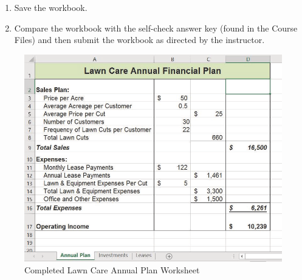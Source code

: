 \begin{enumerate}
	\begin{enumerate}
		\item On the  sheet, apply Accounting format with $ 0 $ decimals to ,  , and . Apply Comma format with $ 0 $ decimals to the ranges  and . 

		\item On the  worksheet, apply Accounting format with two decimals to the range  and . Apply Comma format with two decimals to the range . 
	\end{enumerate}
	
	Double check that the formatting matches Figures \ref{02:fig47}, \ref{02:fig48}, and \ref{02:fig49}.
	
	\item Save the  workbook.
	
	\item Compare the workbook with the self-check answer key (found in the Course Files) and then submit the  workbook as directed by the instructor.
\end{enumerate}

\begin{figure}[H]
	\centering
	\includegraphics[width=\maxwidth{.95\linewidth}]{gfx/ch02_fig47}
	\caption{Completed Lawn Care Annual Plan Worksheet}
	\label{02:fig47}
\end{figure}

